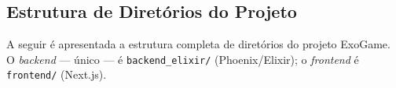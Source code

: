 \documentclass[
	12pt,
	openany,
	oneside,
	a4paper,
	english,
	brazil
]{abntex2}
\begin{document}
\postextual



\begin{apendicesenv}

\partapendices

\chapter{Estrutura de Diretórios do Projeto}\label{ap:estrutura}

A seguir é apresentada a estrutura completa de diretórios do projeto ExoGame. O \textit{backend} --- único --- é \texttt{backend\_elixir/} (Phoenix/Elixir); o \textit{frontend} é \texttt{frontend/} (Next.js).


\end{apendicesenv}
\end{document}
